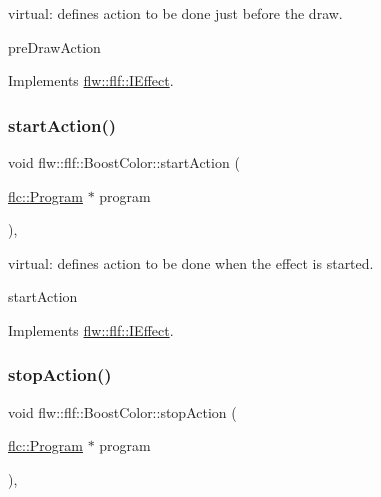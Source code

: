 virtual\+: defines action to be done just before the draw. 

pre\+Draw\+Action 

Implements \hyperlink{classflw_1_1flf_1_1IEffect_ae65eed21e40a226c7739d3c5dedd9e50}{flw\+::flf\+::\+I\+Effect}.

\mbox{\label{classflw_1_1flf_1_1BoostColor_a4bd0b925fea15ce7fc00296e3d2672e6}} 
\subsubsection{\texorpdfstring{start\+Action()}{startAction()}}
{\footnotesize\ttfamily void flw\+::flf\+::\+Boost\+Color\+::start\+Action (\begin{DoxyParamCaption}\item[{\hyperlink{classflw_1_1flc_1_1Program}{flc\+::\+Program} $\ast$}]{program }\end{DoxyParamCaption})\hspace{0.3cm}{\ttfamily [override]}, {\ttfamily [virtual]}}



virtual\+: defines action to be done when the effect is started. 

start\+Action 

Implements \hyperlink{classflw_1_1flf_1_1IEffect_afc7cec9080d135ed264b08a90c7b94e9}{flw\+::flf\+::\+I\+Effect}.

\mbox{\label{classflw_1_1flf_1_1BoostColor_a80c34ed26ed847e39fc036baad24e1d5}} 
\subsubsection{\texorpdfstring{stop\+Action()}{stopAction()}}
{\footnotesize\ttfamily void flw\+::flf\+::\+Boost\+Color\+::stop\+Action (\begin{DoxyParamCaption}\item[{\hyperlink{classflw_1_1flc_1_1Program}{flc\+::\+Program} $\ast$}]{program }\end{DoxyParamCaption})\hspace{0.3cm}{\ttfamily [override]}, {\ttfamily [virtual]}}



